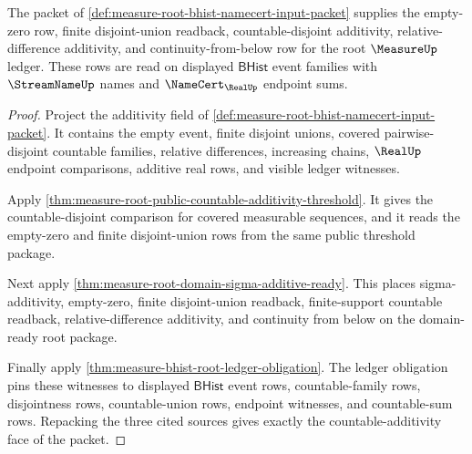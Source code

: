 \begin{theorem}
\label{thm:measure-root-bhist-input-countable-additivity}
The packet of
\autoref{def:measure-root-bhist-namecert-input-packet} supplies the
empty-zero row, finite disjoint-union readback, countable-disjoint additivity,
relative-difference additivity, and continuity-from-below row for the root
$\MeasureUp$ ledger. These rows are read on displayed $\mathsf{BHist}$ event
families with $\StreamNameUp$ names and $\NameCert_{\RealUp}$ endpoint sums.
\end{theorem}
\begin{proof}
Project the additivity field of
\autoref{def:measure-root-bhist-namecert-input-packet}. It contains the
empty event, finite disjoint unions, covered pairwise-disjoint countable
families, relative differences, increasing chains, $\RealUp$ endpoint
comparisons, additive real rows, and visible ledger witnesses.

Apply \autoref{thm:measure-root-public-countable-additivity-threshold}. It
gives the countable-disjoint comparison for covered measurable sequences,
and it reads the empty-zero and finite disjoint-union rows from the same
public threshold package.

Next apply \autoref{thm:measure-root-domain-sigma-additive-ready}. This
places sigma-additivity, empty-zero, finite disjoint-union readback,
finite-support countable readback, relative-difference additivity, and
continuity from below on the domain-ready root package.

Finally apply \autoref{thm:measure-bhist-root-ledger-obligation}. The ledger
obligation pins these witnesses to displayed $\mathsf{BHist}$ event rows,
countable-family rows, disjointness rows, countable-union rows, endpoint
witnesses, and countable-sum rows. Repacking the three cited sources gives
exactly the countable-additivity face of the packet.
\end{proof}

